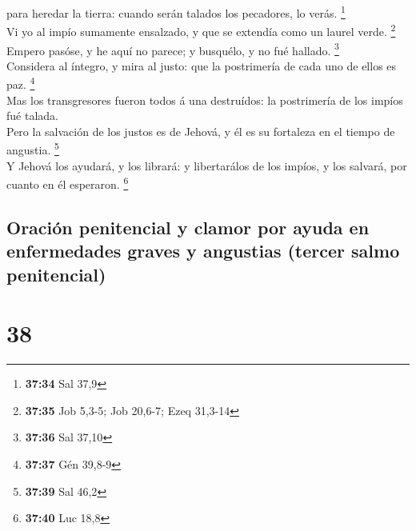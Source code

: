 para heredar la tierra: cuando serán talados los pecadores, lo verás.
\footnote{\textbf{37:34} Sal 37,9}\\
 Vi yo al impío sumamente ensalzado, y que se extendía
como un laurel verde. \footnote{\textbf{37:35} Job 5,3-5; Job 20,6-7;
  Ezeq 31,3-14}\\
 Empero pasóse, y he aquí no parece; y busquélo, y no fué
hallado. \footnote{\textbf{37:36} Sal 37,10}\\
 Considera al íntegro, y mira al justo: que la
postrimería de cada uno de ellos es paz. \footnote{\textbf{37:37} Gén
  39,8-9}\\
 Mas los transgresores fueron todos á una destruídos: la
postrimería de los impíos fué talada.\\
 Pero la salvación de los justos es de Jehová, y él es su
fortaleza en el tiempo de angustia. \footnote{\textbf{37:39} Sal 46,2}\\
 Y Jehová los ayudará, y los librará: y libertarálos de
los impíos, y los salvará, por cuanto en él esperaron. \footnote{\textbf{37:40}
  Luc 18,8}

\hypertarget{oraciuxf3n-penitencial-y-clamor-por-ayuda-en-enfermedades-graves-y-angustias-tercer-salmo-penitencial}{%
\subsection{Oración penitencial y clamor por ayuda en enfermedades
graves y angustias (tercer salmo
penitencial)}\label{oraciuxf3n-penitencial-y-clamor-por-ayuda-en-enfermedades-graves-y-angustias-tercer-salmo-penitencial}}

\hypertarget{section-37}{%
\section{38}\label{section-37}}

